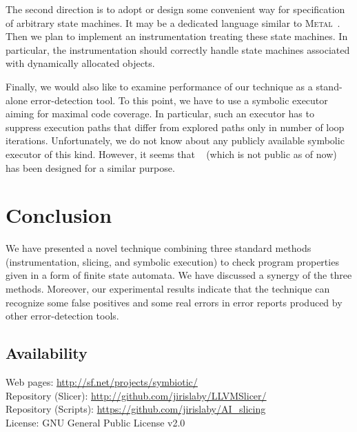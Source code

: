 The second direction is to adopt or design some convenient way for
specification of arbitrary state machines. It may be a dedicated language
similar to \textsc{Metal}~\cite{metal}. Then we plan to implement an
instrumentation treating these state machines. In particular, the
instrumentation should correctly handle state machines associated with
dynamically allocated objects.

Finally, we would also like to examine performance of our technique as a
stand-alone error-detection tool. To this point, we have to use a symbolic
executor aiming for maximal code coverage. In particular, such an executor
has to suppress execution paths that differ from explored paths only in
number of loop iterations. Unfortunately, we do not know about any publicly
available symbolic executor of this kind. However, it seems that
\ucklee~\cite{ucklee} (which is not public as of now) has been
designed for a similar purpose.


\section{Conclusion}\label{sec:fmics_conclusion}
We have presented a novel technique combining three standard methods
(instrumentation, slicing, and symbolic execution) to check program
properties given in a form of finite state automata. We have discussed a
synergy of the three methods. Moreover, our experimental results indicate that
the technique can recognize some false positives and some real errors in error
reports produced by other error-detection tools.


\subsection*{Availability}
\noindent Web pages: \url{http://sf.net/projects/symbiotic/} \\
\noindent Repository (Slicer): \url{http://github.com/jirislaby/LLVMSlicer/} \\
\noindent Repository (Scripts): \url{https://github.com/jirislaby/AI_slicing} \\
\noindent License: GNU General Public License v2.0

